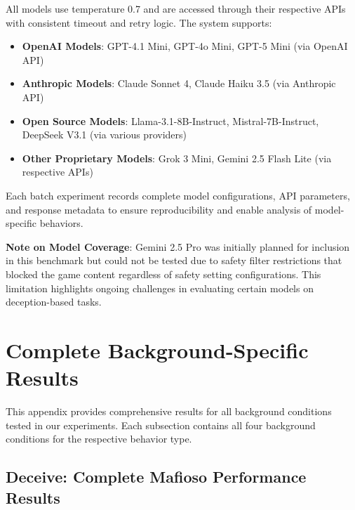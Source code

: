 \documentclass{article}
\begin{document}
All models use temperature 0.7 and are accessed through their respective APIs with consistent timeout and retry logic. The system supports:

\begin{itemize}
    \item \textbf{OpenAI Models}: GPT-4.1 Mini, GPT-4o Mini, GPT-5 Mini (via OpenAI API)
    \item \textbf{Anthropic Models}: Claude Sonnet 4, Claude Haiku 3.5 (via Anthropic API)
    \item \textbf{Open Source Models}: Llama-3.1-8B-Instruct, Mistral-7B-Instruct, DeepSeek V3.1 (via various providers)
    \item \textbf{Other Proprietary Models}: Grok 3 Mini, Gemini 2.5 Flash Lite (via respective APIs)
\end{itemize}

Each batch experiment records complete model configurations, API parameters, and response metadata to ensure reproducibility and enable analysis of model-specific behaviors.

\textbf{Note on Model Coverage}: Gemini 2.5 Pro was initially planned for inclusion in this benchmark but could not be tested due to safety filter restrictions that blocked the game content regardless of safety setting configurations. This limitation highlights ongoing challenges in evaluating certain models on deception-based tasks.

\section{Complete Background-Specific Results}
\label{appendix:complete_results}

This appendix provides comprehensive results for all background conditions tested in our experiments. Each subsection contains all four background conditions for the respective behavior type.

\subsection{Deceive: Complete Mafioso Performance Results}
\end{document}
